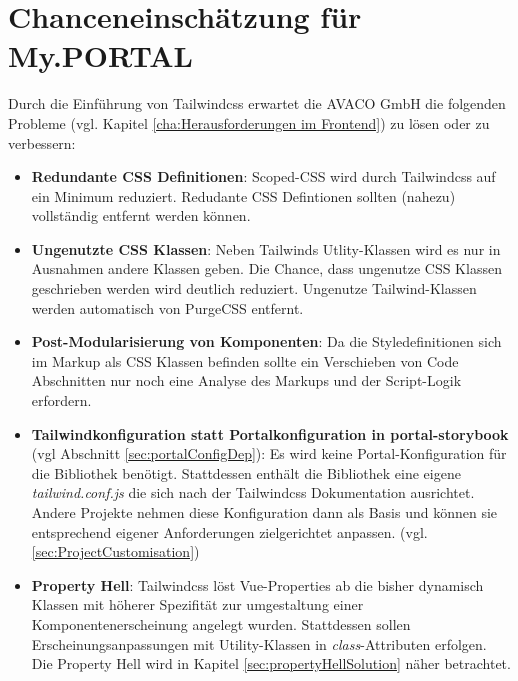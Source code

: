 \section{Chanceneinschätzung für My.PORTAL}
\label{sec:Chanceneinschtzung}
Durch die Einführung von Tailwindcss erwartet die AVACO GmbH die folgenden Probleme (vgl. Kapitel \ref{cha:Herausforderungen im Frontend}) zu lösen oder zu verbessern:

\begin{itemize}
  \item \textbf{Redundante CSS Definitionen}: Scoped-CSS wird durch Tailwindcss auf ein Minimum reduziert. Redudante CSS Defintionen sollten (nahezu) vollständig entfernt werden können.
  \item \textbf{Ungenutzte CSS Klassen}: Neben Tailwinds Utlity-Klassen wird es nur in Ausnahmen andere Klassen geben. Die Chance, dass ungenutze CSS Klassen geschrieben werden wird deutlich reduziert. Ungenutze Tailwind-Klassen werden automatisch von PurgeCSS entfernt.
  \item \textbf{Post-Modularisierung von Komponenten}: Da die Styledefinitionen sich im Markup als CSS Klassen befinden sollte ein Verschieben von Code Abschnitten nur noch eine Analyse des Markups und der Script-Logik erfordern.
  \item \textbf{Tailwindkonfiguration statt Portalkonfiguration in portal-storybook} (vgl Abschnitt \ref{sec:portalConfigDep}): Es wird keine Portal-Konfiguration für die Bibliothek benötigt. Stattdessen enthält die Bibliothek eine eigene \textit{tailwind.conf.js} die sich nach der Tailwindcss Dokumentation ausrichtet. Andere Projekte nehmen diese Konfiguration dann als Basis und können sie entsprechend eigener Anforderungen zielgerichtet anpassen. (vgl. \ref{sec:ProjectCustomisation})
  \item \textbf{Property Hell}: Tailwindcss löst Vue-Properties ab die bisher dynamisch Klassen mit höherer Spezifität zur umgestaltung einer Komponentenerscheinung angelegt wurden. Stattdessen sollen Erscheinungsanpassungen mit Utility-Klassen in \textit{class}-Attributen erfolgen. Die Property Hell wird in Kapitel \ref{sec:propertyHellSolution} näher betrachtet.
\end{itemize}

